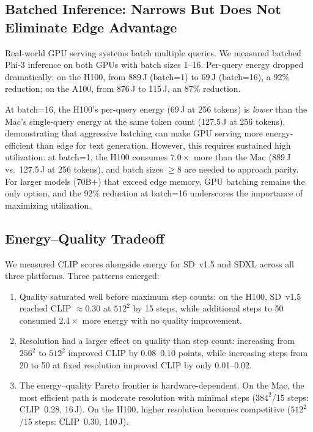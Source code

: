 \documentclass[acmlarge,manuscript,screen,review]{acmart}
\begin{document}
\subsection{Batched Inference: Narrows But Does Not Eliminate Edge Advantage}
\label{sec:batched}

Real-world GPU serving systems batch multiple queries. We measured batched Phi-3 inference on both GPUs with batch sizes 1--16. Per-query energy dropped dramatically: on the H100, from 889\,J (batch=1) to 69\,J (batch=16), a 92\% reduction; on the A100, from 876\,J to 115\,J, an 87\% reduction.

At batch=16, the H100's per-query energy (69\,J at 256 tokens) is \emph{lower} than the Mac's single-query energy at the same token count (127.5\,J at 256 tokens), demonstrating that aggressive batching can make GPU serving more energy-efficient than edge for text generation. However, this requires sustained high utilization: at batch=1, the H100 consumes $7.0\times$ more than the Mac (889\,J vs.\ 127.5\,J at 256 tokens), and batch sizes $\geq 8$ are needed to approach parity. For larger models (70B+) that exceed edge memory, GPU batching remains the only option, and the 92\% reduction at batch=16 underscores the importance of maximizing utilization.

\subsection{Energy--Quality Tradeoff}

We measured CLIP scores alongside energy for SD~v1.5 and SDXL across all three platforms. Three patterns emerged:
\begin{enumerate}[leftmargin=*]
\item Quality saturated well before maximum step counts: on the H100, SD~v1.5 reached CLIP $\approx 0.30$ at $512^2$ by 15 steps, while additional steps to 50 consumed $2.4\times$ more energy with no quality improvement.
\item Resolution had a larger effect on quality than step count: increasing from $256^2$ to $512^2$ improved CLIP by 0.08--0.10 points, while increasing steps from 20 to 50 at fixed resolution improved CLIP by only 0.01--0.02.
\item The energy--quality Pareto frontier is hardware-dependent. On the Mac, the most efficient path is moderate resolution with minimal steps ($384^2$/15 steps: CLIP~0.28, 16\,J). On the H100, higher resolution becomes competitive ($512^2$/15 steps: CLIP~0.30, 140\,J).
\end{enumerate}
\end{document}
